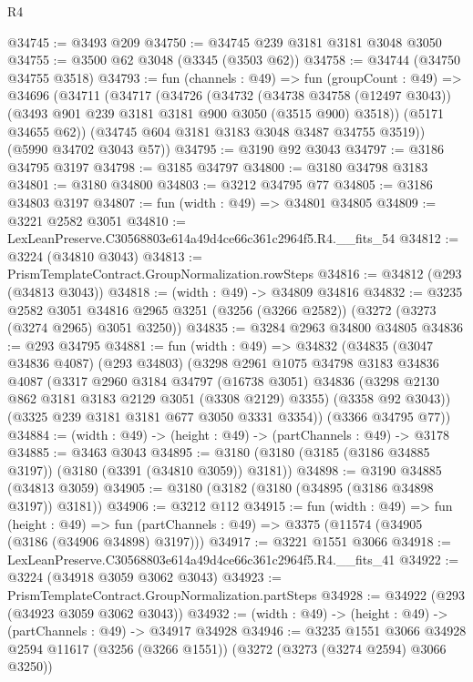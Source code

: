 \begin{lexlean}{R4}
\begin{coremodule}
@34745 := @3493 @209
@34750 := @34745 @239 @3181 @3181 @3048 @3050
@34755 := @3500 @62 @3048 (@3345 (@3503 @62))
@34758 := @34744 (@34750 @34755 @3518)
@34793 := fun (channels : @49) =>
  fun (groupCount : @49) =>
  @34696
    (@34711
      (@34717
        (@34726
          (@34732
            (@34738 @34758 (@12497 @3043))
            (@3493 @901 @239 @3181 @3181 @900 @3050 (@3515 @900) @3518))
          (@5171 @34655 @62))
        (@34745 @604 @3181 @3183 @3048 @3487 @34755 @3519))
      (@5990 @34702 @3043 @57))
@34795 := @3190 @92 @3043
@34797 := @3186 @34795 @3197
@34798 := @3185 @34797
@34800 := @3180 @34798 @3183
@34801 := @3180 @34800
@34803 := @3212 @34795 @77
@34805 := @3186 @34803 @3197
@34807 := fun (width : @49) => @34801 @34805
@34809 := @3221 @2582 @3051
@34810 := LexLeanPreserve.C30568803e614a49d4ce66c361c2964f5.R4.__fits_54
@34812 := @3224 (@34810 @3043)
@34813 := PrismTemplateContract.GroupNormalization.rowSteps
@34816 := @34812 (@293 (@34813 @3043))
@34818 := (width : @49) -> @34809 @34816
@34832 := @3235
    @2582
    @3051
    @34816
    @2965
    @3251
    (@3256 (@3266 @2582))
    (@3272 (@3273 (@3274 @2965) @3051 @3250))
@34835 := @3284 @2963 @34800 @34805
@34836 := @293 @34795
@34881 := fun (width : @49) =>
  @34832
    (@34835
      (@3047 @34836 @4087)
      (@293 @34803)
      (@3298
        @2961
        @1075
        @34798
        @3183
        @34836
        @4087
        (@3317
          @2960
          @3184
          @34797
          (@16738 @3051)
          @34836
          (@3298 @2130 @862 @3181 @3183 @2129 @3051 (@3308 @2129) @3355)
          (@3358 @92 @3043))
        (@3325 @239 @3181 @3181 @677 @3050 @3331 @3354))
      (@3366 @34795 @77))
@34884 := (width : @49) -> (height : @49) -> (partChannels : @49) -> @3178
@34885 := @3463 @3043
@34895 := @3180 (@3180 (@3185 (@3186 @34885 @3197)) (@3180 (@3391 (@34810 @3059)) @3181))
@34898 := @3190 @34885 (@34813 @3059)
@34905 := @3180 (@3182 (@3180 (@34895 (@3186 @34898 @3197)) @3181))
@34906 := @3212 @112
@34915 := fun (width : @49) =>
  fun (height : @49) =>
  fun (partChannels : @49) => @3375 (@11574 (@34905 (@3186 (@34906 @34898) @3197)))
@34917 := @3221 @1551 @3066
@34918 := LexLeanPreserve.C30568803e614a49d4ce66c361c2964f5.R4.__fits_41
@34922 := @3224 (@34918 @3059 @3062 @3043)
@34923 := PrismTemplateContract.GroupNormalization.partSteps
@34928 := @34922 (@293 (@34923 @3059 @3062 @3043))
@34932 := (width : @49) -> (height : @49) -> (partChannels : @49) -> @34917 @34928
@34946 := @3235
    @1551
    @3066
    @34928
    @2594
    @11617
    (@3256 (@3266 @1551))
    (@3272 (@3273 (@3274 @2594) @3066 @3250))

\end{coremodule}
\end{lexlean}
